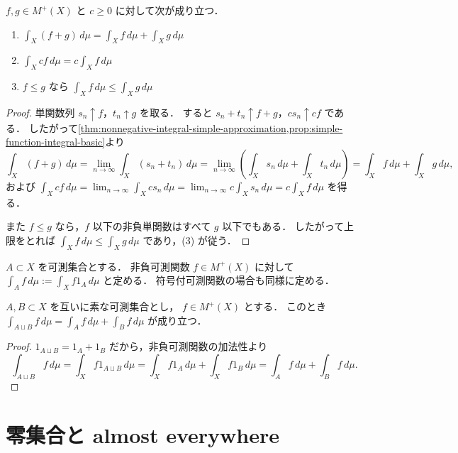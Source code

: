 \begin{proposition}[非負可測関数の基本性質]\label{prop:nonnegative-integral-basic}
$f,g\in M^+(X)$ と $c \ge 0$ に対して次が成り立つ．
\begin{enumerate}
    \item $\int_X (f+g)\,d\mu = \int_X f\,d\mu + \int_X g\,d\mu$
    \item $\int_X cf\,d\mu = c\int_X f\,d\mu$
    \item $f \le g$ なら $\int_X f\,d\mu \le \int_X g\,d\mu$
\end{enumerate}
\end{proposition}
\begin{proof}
単関数列 $s_n \uparrow f$，$t_n \uparrow g$ を取る．
すると $s_n+t_n \uparrow f+g$，$cs_n \uparrow cf$ である．
したがって\cref{thm:nonnegative-integral-simple-approximation,prop:simple-function-integral-basic}より
\[
\int_X (f+g)\,d\mu
=\lim_{n\to\infty}\int_X (s_n+t_n)\,d\mu
=\lim_{n\to\infty}\left(\int_X s_n\,d\mu+\int_X t_n\,d\mu\right)
=\int_X f\,d\mu+\int_X g\,d\mu,
\]
および
$\int_X cf\,d\mu=\lim_{n\to\infty}\int_X cs_n\,d\mu
=\lim_{n\to\infty} c\int_X s_n\,d\mu=c\int_X f\,d\mu$
を得る．

また $f\le g$ なら，$f$ 以下の非負単関数はすべて $g$ 以下でもある．
したがって上限をとれば $\int_X f\,d\mu\le \int_X g\,d\mu$ であり，(3) が従う．
\end{proof}

\begin{definition}[部分集合上の積分]\label{def:integral-over-subset}
$A \subset X$ を可測集合とする．
非負可測関数 $f\in M^+(X)$ に対して
$\int_A f\,d\mu := \int_X f1_A\,d\mu$ と定める．
符号付可測関数の場合も同様に定める．
\end{definition}

\begin{proposition}[集合に関する加法性]\label{prop:nonnegative-integral-disjoint-additivity}
$A,B \subset X$ を互いに素な可測集合とし，
$f\in M^+(X)$ とする．
このとき $\int_{A \sqcup B} f\,d\mu=\int_A f\,d\mu+\int_B f\,d\mu$ が成り立つ．
\end{proposition}
\begin{proof}
$1_{A \sqcup B}=1_A+1_B$ だから，非負可測関数の加法性より
\[
\int_{A \sqcup B} f\,d\mu
=\int_X f1_{A \sqcup B}\,d\mu
=\int_X f1_A\,d\mu+\int_X f1_B\,d\mu
=\int_A f\,d\mu+\int_B f\,d\mu.
\]
\end{proof}

\section{零集合と almost everywhere}

